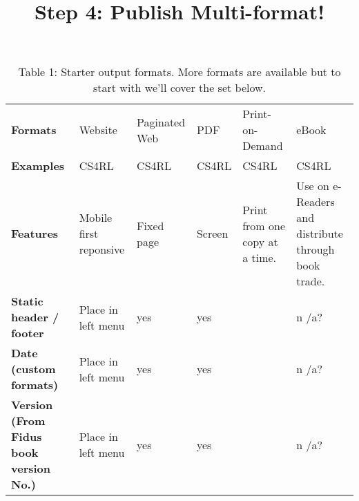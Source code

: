 \documentclass{article}
\begin{document}
\title{Step 4: Publish Multi-format!}

\maketitle

\begin{table}
\caption*{Table 1: Starter output formats. More formats are available but to start with we'll cover the set below.}\label{T63104901}

\begin{tabu} to \textwidth { |X|X|X|X|X|X| }
\hline



\textbf{Formats} & Website & Paginated Web & PDF & Print-on-Demand & eBook
 \\


\textbf{Examples} & CS4RL & CS4RL & CS4RL & CS4RL & CS4RL
 \\


\textbf{Features} & Mobile first reponsive & Fixed page & Screen & Print from one copy at a time.  & Use on e-Readers and distribute through book trade.
 \\


\textbf{Static header / footer} & Place in left menu & yes & yes &  & n /a?
 \\


\textbf{Date (custom formats)} & Place in left menu & yes & yes &  & n /a?
 \\


\textbf{Version (From Fidus book version No.)} & Place in left menu & yes & yes &  & n /a?
 \\
\hline

\end{tabu}\end{table}
\end{document}
